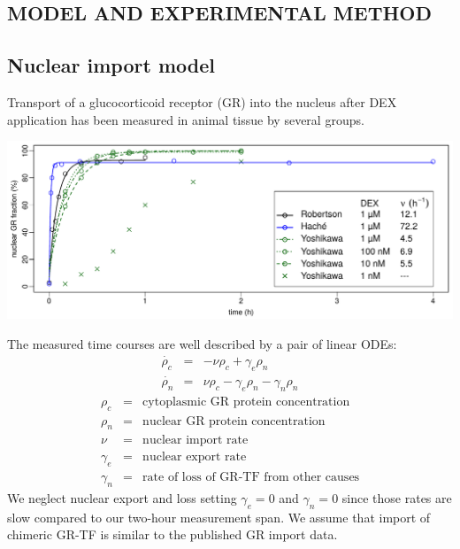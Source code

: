 \documentclass[aspb,landscape]{a0poster}
\newlength{\figwidth}
\newlength{\figtopspace}
\begin{document}
\begin{multicols}{3}
  \color{Black}


  \section*{MODEL AND EXPERIMENTAL METHOD}



  \subsection*{Nuclear import model}

  Transport of a glucocorticoid receptor (GR) into the nucleus after DEX application has been measured in animal tissue by several groups.

  \begin{center}\vspace{\figtopspace}
    \includegraphics[width=\figwidth]{robertson-hache-yoshikawa}
  \end{center}
  
  The measured time courses are well described by a pair of linear ODEs:
  \begin{eqnarray*}\label{eq:rho_c_de}
    \dot{\rho_c} &=& -\nu \rho_c + \gamma_e \rho_n \\
    \dot{\rho_n} &=&  \nu \rho_c - \gamma_e \rho_n - \gamma_n \rho_n
  \end{eqnarray*}
  \begin{eqnarray*}
    \rho_c &=& \text{cytoplasmic GR protein concentration} \\
    \rho_n &=& \text{nuclear GR protein concentration} \\
    \nu &=& \text{nuclear import rate} \\
    \gamma_e &=& \text{nuclear export rate} \\
    \gamma_n &=& \text{rate of loss of GR-TF from other causes}
  \end{eqnarray*}
  We neglect nuclear export and loss setting $\gamma_e=0$ and $\gamma_n=0$ since those rates are slow compared to our two-hour measurement span.
  We assume that import of chimeric GR-TF is similar to the published GR import data.


\end{multicols}
\end{document}
